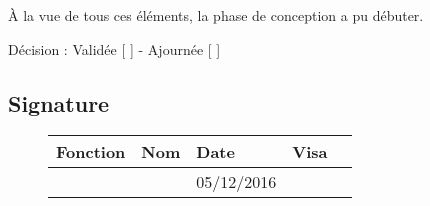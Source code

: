 \documentclass[asi, sansVersion]{picInsa}
\begin{document}
À la vue de tous ces éléments, la phase de conception a pu débuter.

\begin{center}
Décision : Validée [ \checkmark{} ] - Ajournée [ ]
\end{center}

\subsection*{Signature}
\begin{figure}[H]
		\centering
		\begin{tabularx}{17cm}{|p{4cm}|X|X|X|X|}
		\hline
		\rowcolor[gray]{0.85} Fonction & Nom & Date & Visa \\
		\hline
		\CP{} & \Pierre{} & 05/12/2016 & \\
		\hline
		\end{tabularx}
\end{figure}
\end{document}
